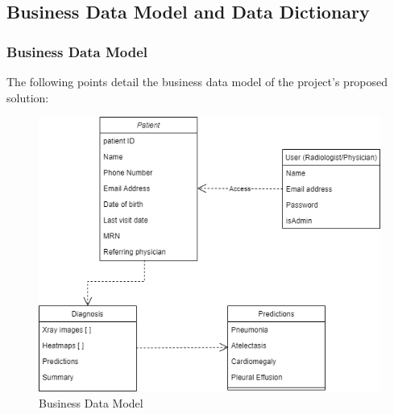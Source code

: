 \documentclass[12pt]{article}
\begin{document}
\subsection{Business Data Model and Data Dictionary}
\subsubsection{Business Data Model}
The following points detail the business data model of the project's proposed solution:
\begin{figure}[H]
    \centering
    \includegraphics[scale=0.60]{businessdatamodel.png}
    \caption{Business Data Model}
    \label{fig:contextDiagram}
\end{figure}
\end{document}
